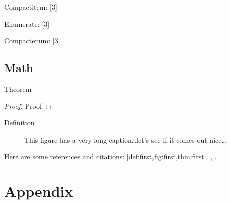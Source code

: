 \documentclass[italian,counters by chapter]{uniud}
\begin{document}
\blindtext[1]
Compactitem:
[3]

\blindtext[1]
Enumerate:
[3]

\blindtext[1]
Compactenum:
[3]
\blindtext[1]

\section{Math}

\begin{theorem}
	\label{thm:first}
	Theorem
\end{theorem}
\begin{proof}
	Proof
\end{proof}

\begin{definition}
	\label{def:first}
	Definition
\end{definition}

\begin{remark}
	\label{rem:first}
	\blindtext[1]
\end{remark}

\begin{figure}[t]
\begin{center}
\end{center}
\caption{This figure has a very long caption\dots let's see if it comes out nice\dots}
\label{fig:first}
\end{figure}

Here are some references and citations: \cref{def:first,fig:first,thm:first}. , \cite{article,book,booklet,conference,inbook,incollection,manual,mastersthesis,misc,phdthesis,proceedings,techreport,unpublished}.


\blindmathpaper






\appendix

\chapter{Appendix}
\lipsum[1-7]
\end{document}
